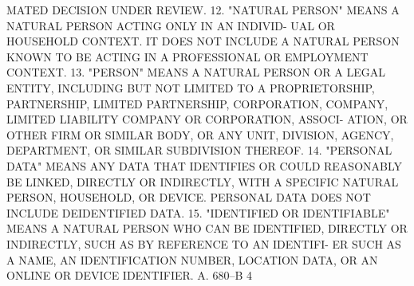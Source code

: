  MATED DECISION UNDER REVIEW.
   12. "NATURAL PERSON" MEANS A NATURAL PERSON ACTING ONLY IN AN INDIVID-
 UAL  OR HOUSEHOLD CONTEXT. IT DOES NOT INCLUDE A NATURAL PERSON KNOWN TO
 BE ACTING IN A PROFESSIONAL OR EMPLOYMENT CONTEXT.
   13. "PERSON" MEANS A NATURAL PERSON OR A LEGAL ENTITY,  INCLUDING  BUT
 NOT  LIMITED  TO  A  PROPRIETORSHIP,  PARTNERSHIP,  LIMITED PARTNERSHIP,
 CORPORATION, COMPANY, LIMITED LIABILITY COMPANY OR CORPORATION,  ASSOCI-
 ATION,  OR  OTHER  FIRM  OR SIMILAR BODY, OR ANY UNIT, DIVISION, AGENCY,
 DEPARTMENT, OR SIMILAR SUBDIVISION THEREOF.
   14. "PERSONAL DATA" MEANS ANY DATA THAT IDENTIFIES OR COULD REASONABLY
 BE LINKED, DIRECTLY OR  INDIRECTLY,  WITH  A  SPECIFIC  NATURAL  PERSON,
 HOUSEHOLD, OR DEVICE.  PERSONAL DATA DOES NOT INCLUDE DEIDENTIFIED DATA.
   15.  "IDENTIFIED  OR  IDENTIFIABLE"  MEANS A NATURAL PERSON WHO CAN BE
 IDENTIFIED, DIRECTLY OR INDIRECTLY, SUCH AS BY REFERENCE TO AN IDENTIFI-
 ER SUCH AS A NAME, AN IDENTIFICATION NUMBER, LOCATION DATA, OR AN ONLINE
 OR DEVICE IDENTIFIER.
 A. 680--B                           4
 

